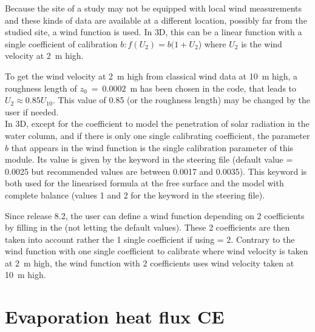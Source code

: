 Because the site of a study may not be equipped with local wind measurements
and these kinds of data are available at a different location, possibly far
from the studied site, a wind function is used.
In 3D, this can be a linear function with
a single coefficient of calibration $b:f(U_{2}) = b(1+U_{2}$) where $U_{2}$ is
the wind velocity at 2~m high.

To get the wind velocity at 2~m high from classical wind data at 10~m high, a
roughness length of ${z}_{0}~=~0.0002$~m has been chosen in the code,
that leads to $U_{2} \approx 0.85 U_{10}$. This value
of 0.85 (or the roughness length) may be changed by the user if needed.\\

In 3D, except for the coefficient to model the penetration of solar radiation in the
water column,
and if there is only one single calibrating coefficient,
the parameter $b$ that appears in the wind function is the
single calibration parameter of this module. Its value is given by the keyword
in the \waqtel steering file (default
value = 0.0025 but recommended values are between 0.0017 and 0.0035). This
keyword is both used for the linearised formula at the free surface and the
model with complete balance (values 1 and 2 for the keyword
 in the \waqtel steering file).

Since release 8.2, the user can define a wind function depending on 2 coefficients
by filling in the 
(not letting the default values).
These 2 coefficients are then taken into account rather the 1 single coefficient
if using  = 2.
Contrary to the wind function with one single coefficient to calibrate where
wind velocity is taken at 2~m high, the wind function with 2 coefficients
uses wind velocity taken at 10~m high.


\section{Evaporation heat flux CE}

